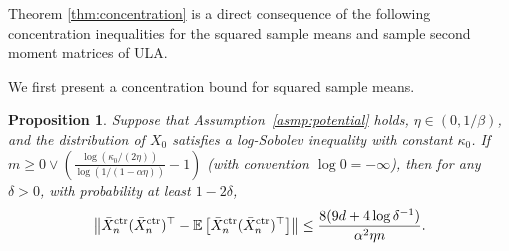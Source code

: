 \documentclass[12pt,reqno]{amsart}
\newtheorem{proposition}[theorem]{Proposition}
\theoremstyle{remark}
\theoremstyle{definition}
\newcommand{\E}{\mathbb{E}}
\newcommand{\ctr}{\textnormal{ctr}}
\begin{document}
Theorem \ref{thm:concentration} is a direct consequence of the following concentration inequalities for the squared sample means and sample second moment matrices of ULA.

We first present a concentration bound for squared sample means.
\begin{proposition}\label{prop:first}
    Suppose that Assumption~\ref{asmp:potential} holds, $\eta\in(0,1/\beta)$, and the distribution of $X_{0}$ satisfies a log-Sobolev inequality with constant $\kappa_{0}$.
    If $m\ge 0\vee(\frac{\log(\kappa_{0}/(2\eta))}{\log(1/(1-\alpha\eta))}-1)$ (with convention $\log0=-\infty$), then for any $\delta>0$, with probability at least $1-2\delta$,
    \begin{equation*}
        \left\|\bar{X}_{n}^{\ctr}(\bar{X}_{n}^{\ctr})^{\top}-\E\left[\bar{X}_{n}^{\ctr}(\bar{X}_{n}^{\ctr})^{\top}\right]\right\|\le \frac{8 (9 d+4\log\delta^{-1})}{\alpha^{2}\eta n}.
    \end{equation*}
\end{proposition}
\end{document}
